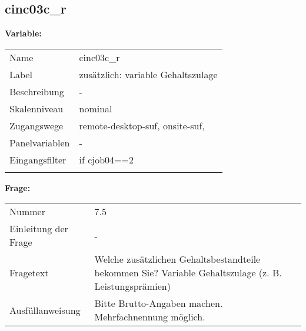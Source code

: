 	
	
	\subsection{cinc03c\_r}
	\label{subSection:cinc03c_r}

	\noindent\textbf{Variable:}\\
		\begin{tabular}{lL{11.3cm}}
			\label{tableVariable:cinc03c_r}
			Name & cinc03c\_r \\
			Label & zusätzlich: variable Gehaltszulage \\
			Beschreibung & - \\
			Skalenniveau & nominal \\
			Zugangswege &
				remote-desktop-suf,
				onsite-suf,
 \\
			Panelvariablen & -
			 \\
			Eingangsfilter & if cjob04==2 \\
 \\
		\end{tabular}

		\vspace*{1 cm}
		\noindent\textbf{Frage:}\\
		\begin{tabular}{lL{11.3cm}}
			\label{tableQuestion:cinc03c_r}
			Nummer & 7.5 \\
			Einleitung der Frage & - \\
			Fragetext & Welche zusätzlichen Gehaltsbestandteile bekommen Sie?
Variable Gehaltszulage
(z. B. Leistungsprämien) \\
			Ausfüllanweisung & 
Bitte Brutto-Angaben machen. Mehrfachnennung möglich. \\
		\end{tabular}






